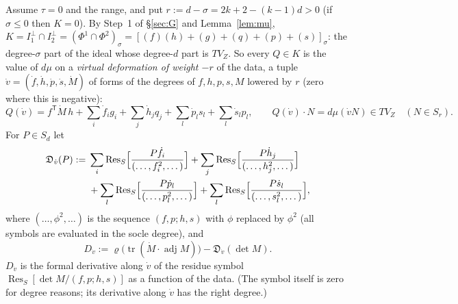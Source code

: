 \documentclass[11pt]{article}
\numberwithin{equation}{section}
\theoremstyle{remark}
\newcommand{\VZ}{V_Z}
\newcommand{\Res}{\operatorname{Res}}
\newcommand{\T}{\mathsf{T}}
\begin{document}
Assume $\tau=0$ and the range, and put $r:=d-\sigma=2k+2-(k-1)d>0$ (if $\sigma\le0$ then $K=0$). By Step~1 of
\S\ref{sec:G} and Lemma~\ref{lem:mu}, $K=I_1^\perp\cap I_2^\perp=(\Phi^1\cap\Phi^2)_\sigma=[(f)(h)+(g)+(q)+(p)+(s)]_\sigma$:
the degree-$\sigma$ part of the ideal whose degree-$d$ part is $T\VZ$. So every $Q\in K$ is the value of $d\mu$ on
a \emph{virtual deformation of weight $-r$} of the data, a tuple
$\dot v=(\dot f,\dot h,\dot p,\dot s,\dot M)$ of forms of the degrees of $f,h,p,s,M$ lowered by $r$ (zero where
this is negative):
\[
Q(\dot v)=f^\T\dot M\,h+\sum_i\dot f_ig_i+\sum_j\dot h_jq_j+\sum_l\dot p_ls_l+\sum_l\dot s_lp_l ,\qquad
Q(\dot v)\cdot N=d\mu(\dot vN)\in T\VZ\quad(N\in S_r).
\]
For $P\in S_d$ let
\begin{align*}
\mathfrak D_{\dot v}(P):={}&\sum_i\Res_S\Bigl[\frac{P\dot f_i}{(\dots,f_i^2,\dots)}\Bigr]+\sum_j\Res_S\Bigl[\frac{P\dot h_j}{(\dots,h_j^2,\dots)}\Bigr]\\
&+\sum_l\Res_S\Bigl[\frac{P\dot p_l}{(\dots,p_l^2,\dots)}\Bigr]+\sum_l\Res_S\Bigl[\frac{P\dot s_l}{(\dots,s_l^2,\dots)}\Bigr],
\end{align*}
where $(\dots,\phi^2,\dots)$ is the sequence $(f,p;h,s)$ with $\phi$ replaced by $\phi^2$ (all symbols are evaluated
in the socle degree), and
\[
D_{\dot v}:=\varrho\bigl(\operatorname{tr}(\dot M\cdot\operatorname{adj}M)\bigr)-\mathfrak D_{\dot v}(\det M).
\]
$D_{\dot v}$ is the formal derivative along $\dot v$ of the residue symbol $\Res_S[\det M/(f,p;h,s)]$ as a function
of the data. (The symbol itself is zero for degree reasons; its derivative along $\dot v$ has the right degree.)
\end{document}
